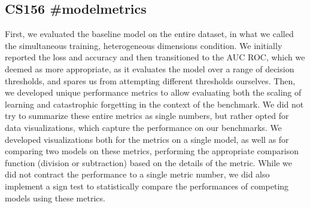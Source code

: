 \subsection{CS156 \#modelmetrics}
First, we evaluated the baseline model on the entire dataset, in what we called the simultaneous training, heterogeneous dimensions condition. We initially reported the loss and accuracy and then transitioned to the AUC ROC, which we deemed as more appropriate, as it evaluates the model over a range of decision thresholds, and spares us from attempting different thresholds ourselves. Then, we developed unique performance metrics to allow evaluating both the scaling of learning and catastrophic forgetting in the context of the benchmark. We did not try to summarize these entire metrics as single numbers, but rather opted for data visualizations, which capture the performance on our benchmarks. We developed visualizations both for the metrics on a single model, as well as for comparing two models on these metrics, performing the appropriate comparison function (division or subtraction) based on the details of the metric. While we did not contract the performance to a single metric number, we did also implement a sign test to statistically compare the performances of competing models using these metrics.
